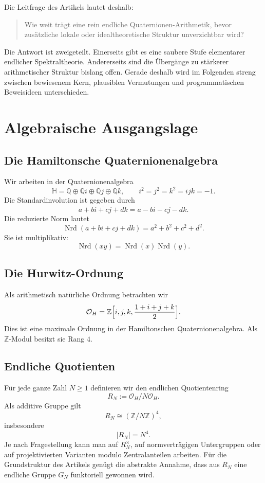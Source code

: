 \documentclass[12pt,a4paper]{article}
\theoremstyle{plain}
\theoremstyle{definition}
\theoremstyle{remark}
\newcommand{\Q}{\mathbb{Q}}
\newcommand{\Z}{\mathbb{Z}}
\newcommand{\OH}{\mathcal{O}_H}
\newcommand{\Nrd}{\operatorname{Nrd}}
\begin{document}
	Die Leitfrage des Artikels lautet deshalb:
	\begin{quote}
		Wie weit trägt eine rein endliche Quaternionen-Arithmetik, bevor zusätzliche lokale oder idealtheoretische Struktur unverzichtbar wird?
	\end{quote}
	
	Die Antwort ist zweigeteilt. Einerseits gibt es eine saubere Stufe elementarer endlicher Spektraltheorie. Andererseits sind die Übergänge zu stärkerer arithmetischer Struktur bislang offen. Gerade deshalb wird im Folgenden streng zwischen bewiesenem Kern, plausiblen Vermutungen und programmatischen Beweisideen unterschieden.
	
	\section{Algebraische Ausgangslage}
	\subsection{Die Hamiltonsche Quaternionenalgebra}
	Wir arbeiten in der Quaternionenalgebra
	\[
	\mathbb H = \Q \oplus \Q i \oplus \Q j \oplus \Q k,
	\qquad i^2=j^2=k^2=ijk=-1.
	\]
	Die Standardinvolution ist gegeben durch
	\[
	\overline{a+bi+cj+dk}=a-bi-cj-dk.
	\]
	Die reduzierte Norm lautet
	\[
	\Nrd(a+bi+cj+dk)=a^2+b^2+c^2+d^2.
	\]
	Sie ist multiplikativ:
	\[
	\Nrd(xy)=\Nrd(x)\Nrd(y).
	\]
	
	\subsection{Die Hurwitz-Ordnung}
	Als arithmetisch natürliche Ordnung betrachten wir
	\[
	\OH = \Z\Bigl[i,j,k,\frac{1+i+j+k}{2}\Bigr].
	\]
	Dies ist eine maximale Ordnung in der Hamiltonschen Quaternionenalgebra. Als $\Z$-Modul besitzt sie Rang $4$.
	
	\subsection{Endliche Quotienten}
	Für jede ganze Zahl $N\ge 1$ definieren wir den endlichen Quotientenring
	\[
	R_N := \OH/N\OH.
	\]
	Als additive Gruppe gilt
	\[
	R_N \cong (\Z/N\Z)^4,
	\]
	insbesondere
	\[
	|R_N|=N^4.
	\]
	Je nach Fragestellung kann man auf $R_N^\times$, auf normverträgigen Untergruppen oder auf projektivierten Varianten modulo Zentralanteilen arbeiten. Für die Grundstruktur des Artikels genügt die abstrakte Annahme, dass aus $R_N$ eine endliche Gruppe $G_N$ funktoriell gewonnen wird.
	
\end{document}

